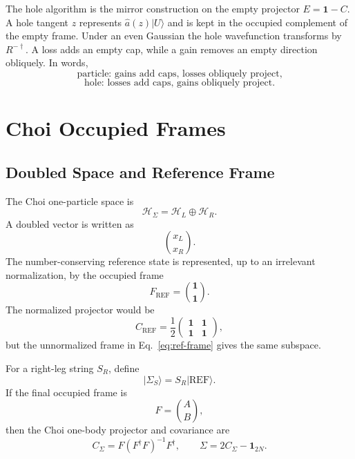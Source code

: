 \documentclass[aps,prb,onecolumn,nofootinbib,superscriptaddress]{revtex4-2}
\newcommand{\cH}{\mathcal H}
\newcommand{\Id}{\mathbf{1}}
\newcommand{\REF}{\mathrm{REF}}
\newcommand{\ket}[1]{\lvert #1\rangle}
\newcommand{\ahat}{\hat a}
\begin{document}
The hole algorithm is the mirror construction on the empty projector
\(E=\Id-C\).  A hole tangent \(z\) represents \(\ahat(z)\ket{U}\) and is
kept in the occupied complement of the empty frame.  Under an even Gaussian
the hole wavefunction transforms by \(R^{-\dagger}\).  A loss adds an empty
cap, while a gain removes an empty direction obliquely.  In words,
\begin{equation}
  \text{particle: gains add caps, losses obliquely project,}
\end{equation}
\begin{equation}
  \text{hole: losses add caps, gains obliquely project.}
\end{equation}

\section{Choi Occupied Frames}

\subsection{Doubled Space and Reference Frame}

The Choi one-particle space is
\begin{equation}
  \cH_\Sigma=\cH_L\oplus\cH_R .
\end{equation}
A doubled vector is written as
\begin{equation}
  \binom{x_L}{x_R}.
\end{equation}
The number-conserving reference state is represented, up to an irrelevant
normalization, by the occupied frame
\begin{equation}
  F_{\REF}=
  \binom{\Id}{\Id}.
  \label{eq:ref-frame}
\end{equation}
The normalized projector would be
\begin{equation}
  C_{\REF}=\frac12
  \begin{pmatrix}
    \Id & \Id\\
    \Id & \Id
  \end{pmatrix},
\end{equation}
but the unnormalized frame in Eq.~\eqref{eq:ref-frame} gives the same
subspace.

For a right-leg string \(S_R\), define
\begin{equation}
  \ket{\Sigma_S}=S_R\ket{\REF}.
\end{equation}
If the final occupied frame is
\begin{equation}
  F=\binom{A}{B},
\end{equation}
then the Choi one-body projector and covariance are
\begin{equation}
  C_\Sigma=F(F^\dagger F)^{-1}F^\dagger,\qquad
  \Sigma=2C_\Sigma-\Id_{2N}.
  \label{eq:choi-projector}
\end{equation}
\end{document}
